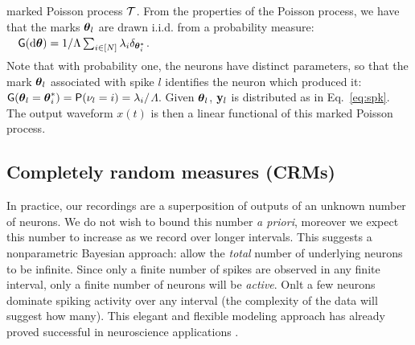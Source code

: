 marked Poisson process $\mathcal{T}$.  From the properties of the Poisson process, we have that the marks $\boldsymbol{\theta}_l$ are drawn i.i.d. from a probability measure:
$\quad  \mathsf{G}(\mathrm{d} \boldsymbol{\theta}) = 1/\Lambda\sum_{i \in [N]} \lambda_i \delta_{\boldsymbol{\theta}^*_i}$.
\vspace{-.27in}
\begin{align}
    \label{eq:mark_distr}
\end{align}
Note that with probability one, the neurons have distinct parameters, so that the mark $\boldsymbol{\theta}_l$ associated with spike $l$ identifies the
neuron which produced it: $\mathsf{G}(\boldsymbol{\theta}_l = \boldsymbol{\theta}^*_i) = \mathsf{P}(\nu_l= i) = \lambda_i/$$\Lambda$. Given $\boldsymbol{\theta}_l$, $\mathbf{y}_l$ is distributed as in
Eq.~\eqref{eq:spk}. The output waveform $x(t)$ is then a linear functional of this marked Poisson process. %

\subsection{Completely random measures (CRMs)}

In practice, our recordings are a superposition of outputs of an unknown
number of neurons. We do not wish to bound this number \emph{a priori}, moreover we expect this number to increase as we 
record over longer intervals. This suggests a nonparametric Bayesian approach: allow the \emph{total} 
number of underlying neurons to be infinite.
Since only a finite number of spikes are observed in any finite interval, only a finite number of neurons will be \emph{active}.
Onlt a few neurons dominate spiking activity over any interval (the complexity of the
data will suggest how many).
This elegant and flexible modeling approach has  already proved 
successful in neuroscience applications \citep{WoodBla2008}.

